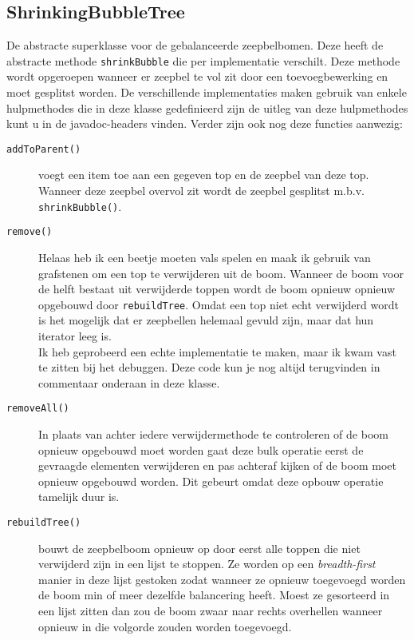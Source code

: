 \documentclass[12pt,hidelinks]{article}
\begin{document}
    \subsection{ShrinkingBubbleTree}
    De abstracte superklasse voor de gebalanceerde zeepbelbomen. Deze heeft de abstracte methode {\tt shrinkBubble} die per implementatie verschilt.
    Deze methode wordt opgeroepen wanneer er zeepbel te vol zit door een toevoegbewerking en moet gesplitst worden.
    De verschillende implementaties maken gebruik van enkele hulpmethodes die in deze klasse gedefinieerd zijn de uitleg van deze hulpmethodes kunt u in de javadoc-headers vinden.
    Verder zijn ook nog deze functies aanwezig:
    \begin{description}
        \item[\tt addToParent()] voegt een item toe aan een gegeven top en de zeepbel van deze top.
            Wanneer deze zeepbel overvol zit wordt de zeepbel gesplitst m.b.v. {\tt shrinkBubble()}.
        \item[\tt remove()] Helaas heb ik een beetje moeten vals spelen en maak ik gebruik van grafstenen om een top te verwijderen uit de boom.
            Wanneer de boom voor de helft bestaat uit verwijderde toppen wordt de boom opnieuw opnieuw opgebouwd door {\tt rebuildTree}.
            Omdat een top niet echt verwijderd wordt is het mogelijk dat er zeepbellen helemaal gevuld zijn, maar dat hun iterator leeg is.
            \\
            Ik heb geprobeerd een echte implementatie te maken, maar ik kwam vast te zitten bij het debuggen. Deze code kun je nog altijd terugvinden in
            commentaar onderaan in deze klasse.
        \item[\tt removeAll()] In plaats van achter iedere verwijdermethode te controleren of de boom opnieuw opgebouwd moet worden gaat deze bulk operatie
            eerst de gevraagde elementen verwijderen en pas achteraf kijken of de boom moet opnieuw opgebouwd worden. Dit gebeurt omdat deze opbouw operatie
            tamelijk duur is.
        \item[\tt rebuildTree()] bouwt de zeepbelboom opnieuw op door eerst alle toppen die niet verwijderd zijn in een lijst te stoppen. Ze worden op een \textit{breadth-first} manier
            in deze lijst gestoken zodat wanneer ze opnieuw toegevoegd worden de boom min of meer dezelfde balancering heeft. Moest ze gesorteerd in een lijst zitten dan zou de boom
            zwaar naar rechts overhellen wanneer opnieuw in die volgorde zouden worden toegevoegd.
    \end{description}
\end{document}
